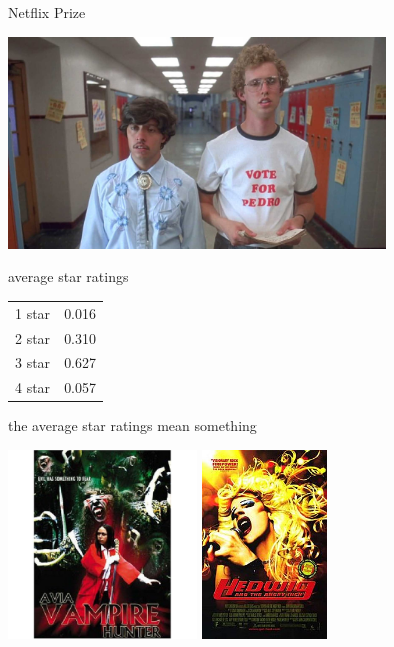 \documentclass{beamer}
\begin{document}
\begin{frame}{Netflix Prize}
  \begin{center}
    \includegraphics[width=10cm]{napoleon.jpg}
  \end{center}
\end{frame}

\begin{frame}{average star ratings}
  \begin{center}
    \begin{tabular}{l|l}
      \hline
      1 star&0.016\\
      2 star&0.310\\
      3 star&0.627\\
      4 star&0.057\\
      \hline
    \end{tabular}
  \end{center}
\end{frame}

\begin{frame}{the average star ratings mean something}
  \begin{center}
    \includegraphics[height=5cm]{avia_vampire_hunter.jpg}
    \includegraphics[height=5cm]{hedwig.jpg}
  \end{center}
\end{frame}
\end{document}
